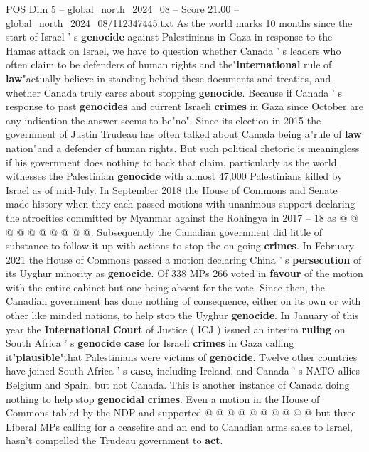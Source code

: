 \begin{textsample}{POS Dim 5 – global\_north\_2024\_08 – Score 21.00 – global\_north\_2024\_08/112347445.txt}  \label{ex:f5_pos_391}
As the world marks 10 months since the start of Israel ' s \textbf{genocide} against Palestinians in Gaza in response to the Hamas attack on Israel, we have to question whether Canada ' s leaders who often claim to be defenders of human rights and the"\textbf{international} rule of \textbf{law}"actually believe in standing behind these documents and treaties, and whether Canada truly cares about stopping \textbf{genocide}.
Because if Canada ' s response to past \textbf{genocides} and current Israeli \textbf{crimes} in Gaza since October are any indication the answer seems to be"no".
Since its election in 2015 the government of Justin Trudeau has often talked about Canada being a"rule of \textbf{law} nation"and a defender of human rights.
But such political rhetoric is meaningless if his government does nothing to back that claim, particularly as the world witnesses the Palestinian \textbf{genocide} with almost 47,000 Palestinians killed by Israel as of mid-July.
In September 2018 the House of Commons and Senate made history when they each passed motions with unanimous support declaring the atrocities committed by Myanmar against the Rohingya in 2017 -- 18 as @ @ @ @ @ @ @ @ @ @.
Subsequently the Canadian government did little of substance to follow it up with actions to stop the on-going \textbf{crimes}.
In February 2021 the House of Commons passed a motion declaring China ' s \textbf{persecution} of its Uyghur minority as \textbf{genocide}.
Of 338 MPs 266 voted in \textbf{favour} of the motion with the entire cabinet but one being absent for the vote.
Since then, the Canadian government has done nothing of consequence, either on its own or with other like minded nations, to help stop the Uyghur \textbf{genocide}.
In January of this year the \textbf{International} \textbf{Court} of Justice ( ICJ ) issued an interim \textbf{ruling} on South Africa ' s \textbf{genocide} \textbf{case} for Israeli \textbf{crimes} in Gaza calling it"\textbf{plausible}"that Palestinians were victims of \textbf{genocide}.
Twelve other countries have joined South Africa ' s \textbf{case}, including Ireland, and Canada ' s NATO allies Belgium and Spain, but not Canada.
This is another instance of Canada doing nothing to help stop \textbf{genocidal} \textbf{crimes}.
Even a motion in the House of Commons tabled by the NDP and supported @ @ @ @ @ @ @ @ @ @ but three Liberal MPs calling for a ceasefire and an end to Canadian arms sales to Israel, hasn't compelled the Trudeau government to \textbf{act}.

\end{textsample}
